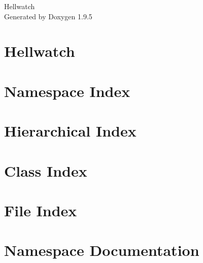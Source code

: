 \documentclass[twoside]{book}
\newcommand{\+}{\discretionary{\mbox{\scriptsize$\hookleftarrow$}}{}{}}
\newcommand{\clearemptydoublepage}{%
    \newpage{\pagestyle{empty}\cleardoublepage}%
  }
\begin{document}
  \raggedbottom
    \hypersetup{pageanchor=false,
                bookmarksnumbered=true,
                pdfencoding=unicode
               }
  \begin{titlepage}
  \vspace*{7cm}
  \begin{center}%
  {\Large Hellwatch}\\
  \vspace*{1cm}
  {\large Generated by Doxygen 1.9.5}\\
  \end{center}
  \end{titlepage}
  \clearemptydoublepage
  \tableofcontents
  \clearemptydoublepage
  \hypersetup{pageanchor=true}
\chapter{Hellwatch}
\label{md__d___uni__c_m_p208__hellwatch__r_e_a_d_m_e}

\chapter{Namespace Index}

\chapter{Hierarchical Index}

\chapter{Class Index}

\chapter{File Index}

\chapter{Namespace Documentation}










\end{document}

